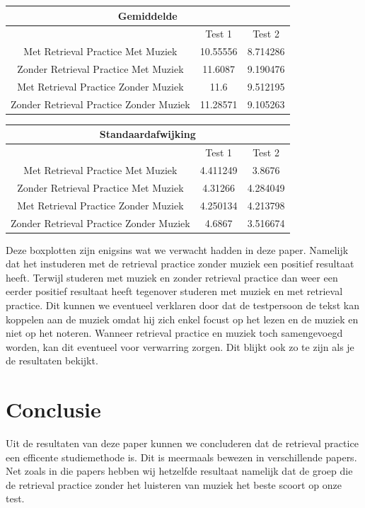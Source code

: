 \documentclass{hogent-article}
\begin{document}
	\begin{tabular}{ |c|c|c| }
	\hline
		\multicolumn{3}{|c|}{Gemiddelde} \\
	\hline
		& Test 1 & Test 2 \\
	\hline
		Met Retrieval Practice Met Muziek  & 10.55556 & 8.714286 \\
		Zonder Retrieval Practice Met Muziek & 11.6087 & 9.190476 \\
		Met Retrieval Practice Zonder Muziek & 11.6 & 9.512195 \\
		Zonder Retrieval Practice Zonder Muziek & 11.28571 & 9.105263 \\
	\hline
	\end{tabular}

	\begin{tabular}{ |c|c|c| }
	\hline
		\multicolumn{3}{|c|}{Standaardafwijking} \\
	\hline
		& Test 1 & Test 2 \\
	\hline
		Met Retrieval Practice Met Muziek  & 4.411249 & 3.8676\\
		Zonder Retrieval Practice Met Muziek & 4.31266 & 4.284049 \\
		Met Retrieval Practice Zonder Muziek & 4.250134  & 4.213798\\
		Zonder Retrieval Practice Zonder Muziek & 4.6867 & 3.516674 \\
	\hline
	\end{tabular}
	
	Deze boxplotten zijn enigsins wat we verwacht hadden in deze paper. Namelijk dat het instuderen met de retrieval practice zonder muziek een positief resultaat heeft. Terwijl studeren met muziek en zonder retrieval practice dan weer een eerder positief resultaat heeft tegenover studeren met muziek en met retrieval practice. Dit kunnen we eventueel verklaren door dat de testpersoon de tekst kan koppelen aan de muziek omdat hij zich enkel focust op het lezen en de muziek en niet op het noteren. Wanneer retrieval practice en muziek toch samengevoegd worden, kan dit eventueel voor verwarring zorgen. Dit blijkt ook zo te zijn als je de resultaten bekijkt. 
	
	\section{Conclusie}
	Uit de resultaten van deze paper kunnen we concluderen dat de retrieval practice een efficente studiemethode is. Dit is meermaals bewezen in verschillende papers. Net zoals in die papers hebben wij hetzelfde resultaat namelijk dat de groep die de retrieval practice zonder het luisteren van muziek het beste scoort op onze test.
	
\end{document}
